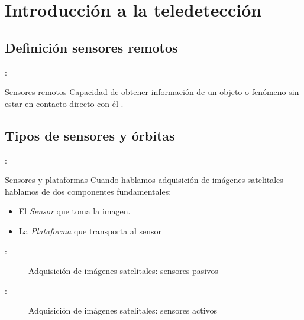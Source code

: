 \section{Introducción a la teledetección}

\subsection{Definición sensores remotos}
\begin{frame}{\secname : \subsecname}
\begin{block}{Sensores remotos}
 Capacidad de obtener información de un objeto o fenómeno sin estar en contacto directo con él .
\end{block}

\end{frame}

\subsection{Tipos de sensores y órbitas}

\begin{frame}{\secname : \subsecname}

\begin{block}{Sensores y plataformas}
  Cuando hablamos adquisición de imágenes satelitales hablamos de dos componentes fundamentales:
  \begin{itemize}
    \item El \emph{Sensor} que toma la imagen.
    \item La \emph{Plataforma} que transporta al sensor
  \end{itemize}
\end{block}

\end{frame}



\begin{frame}{\secname : \subsecname}
  \begin{figure}
    \centering
    \caption{Adquisición de imágenes satelitales: sensores pasivos}
    \label{}
  \end{figure}
\end{frame}

\begin{frame}{\secname : \subsecname}
  \begin{figure}
    \centering
    \caption{Adquisición de imágenes satelitales: sensores activos}
    \label{}
  \end{figure}
\end{frame}

